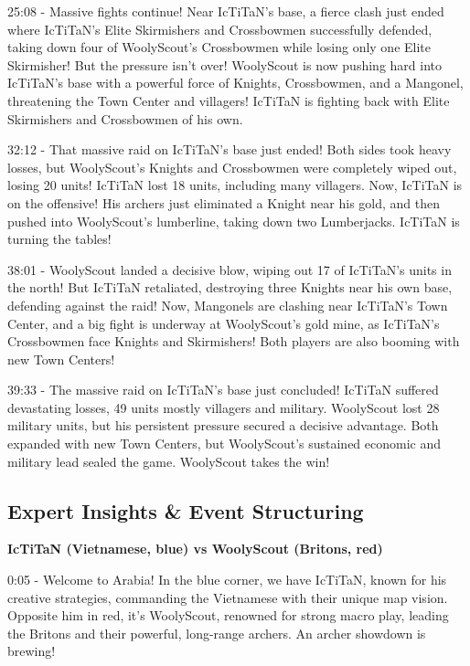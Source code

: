25:08 - Massive fights continue! Near IcTiTaN's base, a fierce clash just ended where IcTiTaN's Elite Skirmishers and Crossbowmen successfully defended, taking down four of WoolyScout's Crossbowmen while losing only one Elite Skirmisher! But the pressure isn't over! WoolyScout is now pushing hard into IcTiTaN's base with a powerful force of Knights, Crossbowmen, and a Mangonel, threatening the Town Center and villagers! IcTiTaN is fighting back with Elite Skirmishers and Crossbowmen of his own. \par \vspace{1em}

32:12 - That massive raid on IcTiTaN's base just ended! Both sides took heavy losses, but WoolyScout's Knights and Crossbowmen were completely wiped out, losing 20 units! IcTiTaN lost 18 units, including many villagers. Now, IcTiTaN is on the offensive! His archers just eliminated a Knight near his gold, and then pushed into WoolyScout's lumberline, taking down two Lumberjacks. IcTiTaN is turning the tables! \par \vspace{1em}

38:01 - WoolyScout landed a decisive blow, wiping out 17 of IcTiTaN's units in the north! But IcTiTaN retaliated, destroying three Knights near his own base, defending against the raid! Now, Mangonels are clashing near IcTiTaN's Town Center, and a big fight is underway at WoolyScout's gold mine, as IcTiTaN's Crossbowmen face Knights and Skirmishers! Both players are also booming with new Town Centers! \par \vspace{1em}

39:33 - The massive raid on IcTiTaN's base just concluded! IcTiTaN suffered devastating losses, 49 units mostly villagers and military. WoolyScout lost 28 military units, but his persistent pressure secured a decisive advantage. Both expanded with new Town Centers, but WoolyScout's sustained economic and military lead sealed the game. WoolyScout takes the win! \par \vspace{1em}

\subsection{Expert Insights \& Event Structuring}
\textbf{IcTiTaN (Vietnamese, blue) vs WoolyScout (Britons, red)}

0:05 - Welcome to Arabia! In the blue corner, we have IcTiTaN, known for his creative strategies, commanding the Vietnamese with their unique map vision. Opposite him in red, it's WoolyScout, renowned for strong macro play, leading the Britons and their powerful, long-range archers. An archer showdown is brewing! \par \vspace{1em}

